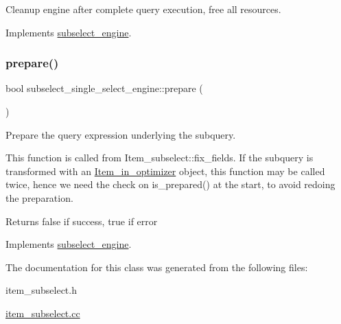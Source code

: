 Cleanup engine after complete query execution, free all resources. 

Implements \mbox{\hyperlink{classsubselect__engine_a0f0051f24ecc4b20f0e3f8d817293276}{subselect\+\_\+engine}}.

\mbox{\label{classsubselect__single__select__engine_abea1c2122554f643c8b82b648f63ba39}} 
\subsubsection{\texorpdfstring{prepare()}{prepare()}}
{\footnotesize\ttfamily bool subselect\+\_\+single\+\_\+select\+\_\+engine\+::prepare (\begin{DoxyParamCaption}{ }\end{DoxyParamCaption})\hspace{0.3cm}{\ttfamily [virtual]}}

Prepare the query expression underlying the subquery.

This function is called from Item\+\_\+subselect\+::fix\+\_\+fields. If the subquery is transformed with an \mbox{\hyperlink{classItem__in__optimizer}{Item\+\_\+in\+\_\+optimizer}} object, this function may be called twice, hence we need the check on \textquotesingle{}is\+\_\+prepared()\textquotesingle{} at the start, to avoid redoing the preparation.

\begin{DoxyReturn}{Returns}
false if success, true if error 
\end{DoxyReturn}


Implements \mbox{\hyperlink{classsubselect__engine}{subselect\+\_\+engine}}.



The documentation for this class was generated from the following files\+:\begin{DoxyCompactItemize}
\item 
item\+\_\+subselect.\+h\item 
\mbox{\hyperlink{item__subselect_8cc}{item\+\_\+subselect.\+cc}}\end{DoxyCompactItemize}
